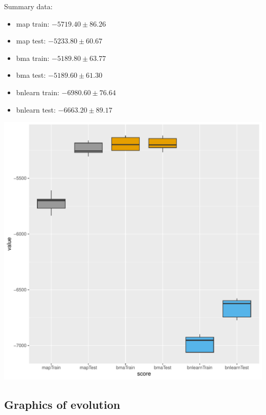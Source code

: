 \documentclass[]{scrartcl}
\begin{document}
Summary data:

\begin{itemize}
\item map train:  $-5719.40  \pm  86.26$
\item map test:  $-5233.80  \pm  60.67$
\item bma train:  $-5189.80  \pm  63.77$
\item bma test:  $-5189.60  \pm  61.30$
\item bnlearn train:  $-6980.60  \pm  76.64$
\item bnlearn test:  $-6663.20  \pm  89.17$
\end{itemize}

\includegraphics[scale = 0.5]{./figs/alarm/alarm-boxplots.pdf}

\subsection{Graphics of evolution}
\end{document}
